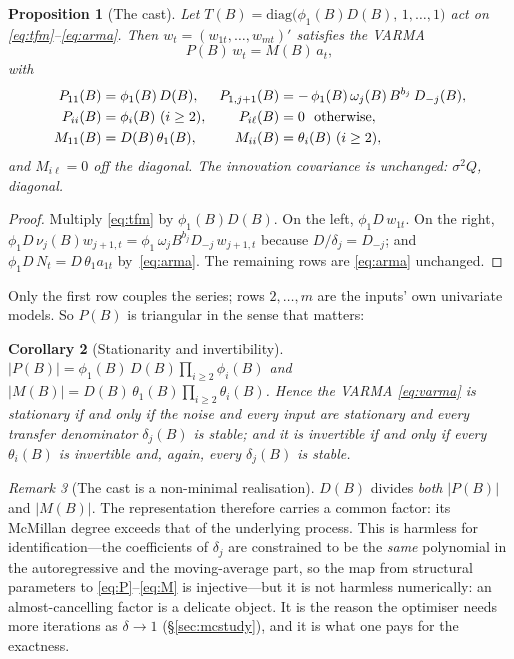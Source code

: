 \documentclass[11pt,a4paper]{article}
\theoremstyle{plain}
\newtheorem{proposition}{Proposition}
\newtheorem{corollary}[proposition]{Corollary}
\theoremstyle{remark}
\newtheorem{remark}[proposition]{Remark}
\begin{document}
\begin{proposition}[The cast]
\label{prop:cast}
Let $T(B)=\mathrm{diag}\bigl(\phi_1(B)D(B),\,1,\dots,1\bigr)$ act on
\eqref{eq:tfm}--\eqref{eq:arma}. Then $w_t=(w_{1t},\dots,w_{mt})'$ satisfies the
VARMA
\begin{equation}
P(B)\,w_t = M(B)\,a_t,
\label{eq:varma}
\end{equation}
with
\begin{align}
P_{11}(B) &= \phi_1(B)\,D(B), &
P_{1,j+1}(B) &= -\,\phi_1(B)\,\omega_j(B)\,B^{b_j}\,D_{-j}(B),\notag\\
P_{ii}(B) &= \phi_i(B)\ (i\ge 2), &
P_{i\ell}(B) &= 0 \ \ \text{otherwise},
\label{eq:P}\\
M_{11}(B) &= D(B)\,\theta_1(B), &
M_{ii}(B) &= \theta_i(B)\ (i\ge 2),
\label{eq:M}
\end{align}
and $M_{i\ell}=0$ off the diagonal. The innovation covariance is unchanged:
$\sigma^2 Q$, diagonal.
\end{proposition}

\begin{proof}
Multiply \eqref{eq:tfm} by $\phi_1(B)D(B)$. On the left, $\phi_1 D\,w_{1t}$. On the
right, $\phi_1 D\,\nu_j(B) w_{j+1,t} = \phi_1\,\omega_j B^{b_j} D_{-j}\,w_{j+1,t}$
because $D/\delta_j=D_{-j}$; and $\phi_1 D\,N_t = D\,\theta_1 a_{1t}$
by~\eqref{eq:arma}. The remaining rows are \eqref{eq:arma} unchanged.
\end{proof}

Only the first row couples the series; rows $2,\dots,m$ are the inputs' own
univariate models. So $P(B)$ is triangular in the sense that matters:

\begin{corollary}[Stationarity and invertibility]
\label{cor:stat}
$|P(B)| = \phi_1(B)\,D(B)\prod_{i\ge2}\phi_i(B)$ and
$|M(B)| = D(B)\,\theta_1(B)\prod_{i\ge2}\theta_i(B)$. Hence the VARMA
\eqref{eq:varma} is stationary if and only if the noise and every input are
stationary \emph{and} every transfer denominator $\delta_j(B)$ is stable; and it is
invertible if and only if every $\theta_i(B)$ is invertible \emph{and}, again, every
$\delta_j(B)$ is stable.
\end{corollary}

\begin{remark}[The cast is a non-minimal realisation]
\label{rem:common}
$D(B)$ divides \emph{both} $|P(B)|$ and $|M(B)|$. The representation therefore
carries a common factor: its McMillan degree exceeds that of the underlying process.
This is harmless for identification---the coefficients of $\delta_j$ are constrained
to be the \emph{same} polynomial in the autoregressive and the moving-average part,
so the map from structural parameters to \eqref{eq:P}--\eqref{eq:M} is
injective---but it is not harmless numerically: an almost-cancelling factor is a
delicate object. It is the reason the optimiser needs more iterations as
$\delta \to 1$ (\S\ref{sec:mcstudy}), and it is what one pays for the exactness.
\end{remark}
\end{document}
